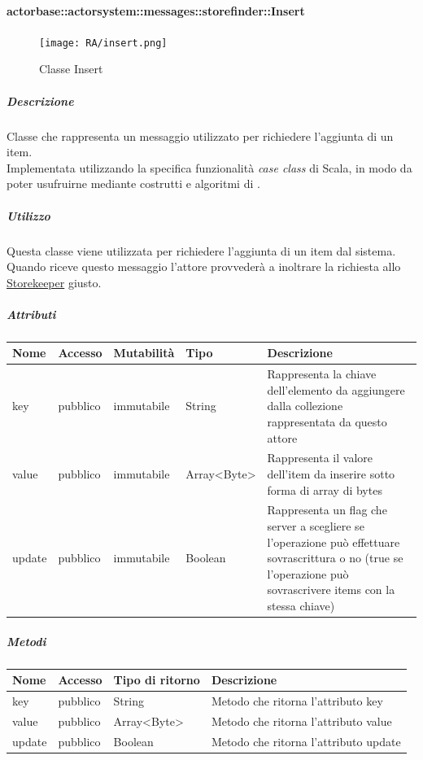 \documentclass{scalatekids-article}
\begin{document}
\paragraph{actorbase::actorsystem::messages::storefinder::Insert}
\label{sec:actorbase::actorsystem::messages::storefinder::Insert}

\begin{figure}[H]
  \begin{center}
    \texttt{[image: RA/insert.png]}
    \caption{Classe Insert}
  \end{center}
\end{figure}

\subparagraph{Descrizione}

Classe che rappresenta un messaggio utilizzato per richiedere l'aggiunta di un item.\\Implementata utilizzando la specifica funzionalità \textit{case class} di Scala,
in modo da poter usufruirne mediante costrutti e algoritmi di
.

\subparagraph{Utilizzo}

Questa classe viene utilizzata per richiedere l'aggiunta di un item dal
sistema.\\Quando riceve questo messaggio l'attore provvederà a inoltrare la
richiesta allo
\hyperref[sec:actorbase::actorsystem::actors::storekeeper::Storekeeper]{Storekeeper}
giusto.

\subparagraph{Attributi}
\begin{tabular}{| p{2cm} | p{1.5cm} | p{2cm} | p{3cm} | p{8.5cm} |}
  \hline
  Nome & Accesso & Mutabilità & Tipo & Descrizione\\
  \hline
  key & pubblico & immutabile & String & Rappresenta la chiave dell'elemento da aggiungere dalla collezione rappresentata da questo attore\\
  \hline
  value & pubblico & immutabile & Array<Byte> & Rappresenta il valore dell'item da inserire sotto forma di array di bytes\\
  \hline
  update & pubblico & immutabile & Boolean & Rappresenta un flag che server a scegliere se l'operazione può effettuare sovrascrittura o no (true se l'operazione può sovrascrivere items con la stessa chiave)\\
  \hline
\end{tabular}

\subparagraph{Metodi}
\begin{tabular}{| p{3cm} | p{1.5cm} | p{3.5cm} | p{9cm} |}
  \hline
  Nome & Accesso & Tipo di ritorno & Descrizione\\
  \hline
  key & pubblico & String & Metodo che ritorna l'attributo key\\
  \hline
  value & pubblico & Array<Byte> & Metodo che ritorna l'attributo value\\
  \hline
  update & pubblico & Boolean & Metodo che ritorna l'attributo update\\
  \hline
\end{tabular}
\end{document}
